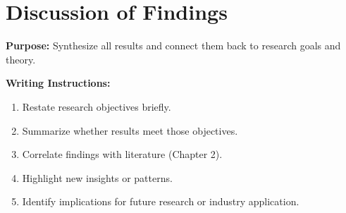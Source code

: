 \section{Discussion of Findings}

{\color{blue}\textbf{Purpose:}
Synthesize all results and connect them back to research goals and theory.} \\

{\color{red}\textbf{Writing Instructions:}
\begin{enumerate}
    \item Restate research objectives briefly.
    
    \item Summarize whether results meet those objectives.
    
    \item Correlate findings with literature (Chapter 2).
    
    \item Highlight new insights or patterns.
    
    \item Identify implications for future research or industry application.
\end{enumerate}}




